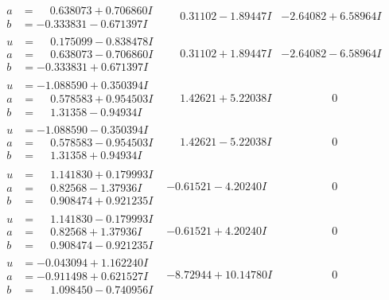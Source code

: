 \documentclass[1p]{elsarticle_modified}
\theoremstyle{definition}
\begin{document}
$$\begin{array}{c|c|c}
\begin{aligned}
a &= \phantom{-}0.638073 + 0.706860 I \\
b &= -0.333831 - 0.671397 I\end{aligned}
 & \phantom{-}0.31102 - 1.89447 I & -2.64082 + 6.58964 I \\ \hline\begin{aligned}
u &= \phantom{-}0.175099 - 0.838478 I \\
a &= \phantom{-}0.638073 - 0.706860 I \\
b &= -0.333831 + 0.671397 I\end{aligned}
 & \phantom{-}0.31102 + 1.89447 I & -2.64082 - 6.58964 I \\ \hline\begin{aligned}
u &= -1.088590 + 0.350394 I \\
a &= \phantom{-}0.578583 + 0.954503 I \\
b &= \phantom{-}1.31358 - 0.94934 I\end{aligned}
 & \phantom{-}1.42621 + 5.22038 I & \phantom{-0.000000 } 0 \\ \hline\begin{aligned}
u &= -1.088590 - 0.350394 I \\
a &= \phantom{-}0.578583 - 0.954503 I \\
b &= \phantom{-}1.31358 + 0.94934 I\end{aligned}
 & \phantom{-}1.42621 - 5.22038 I & \phantom{-0.000000 } 0 \\ \hline\begin{aligned}
u &= \phantom{-}1.141830 + 0.179993 I \\
a &= \phantom{-}0.82568 - 1.37936 I \\
b &= \phantom{-}0.908474 + 0.921235 I\end{aligned}
 & -0.61521 - 4.20240 I & \phantom{-0.000000 } 0 \\ \hline\begin{aligned}
u &= \phantom{-}1.141830 - 0.179993 I \\
a &= \phantom{-}0.82568 + 1.37936 I \\
b &= \phantom{-}0.908474 - 0.921235 I\end{aligned}
 & -0.61521 + 4.20240 I & \phantom{-0.000000 } 0 \\ \hline\begin{aligned}
u &= -0.043094 + 1.162240 I \\
a &= -0.911498 + 0.621527 I \\
b &= \phantom{-}1.098450 - 0.740956 I\end{aligned}
 & -8.72944 + 10.14780 I & \phantom{-0.000000 } 0 \\ \hline\begin{aligned}

\end{aligned}
\end{array}$$
\end{document}

